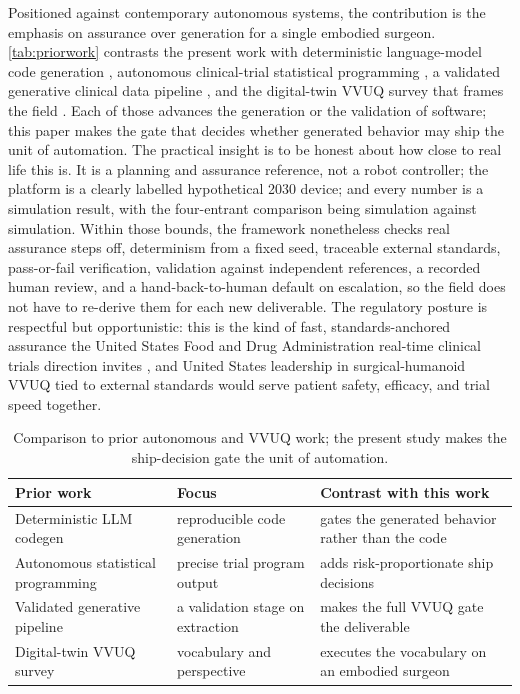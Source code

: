 Positioned against contemporary autonomous systems, the contribution is the
emphasis on assurance over generation for a single embodied surgeon.
\autoref{tab:priorwork} contrasts the present work with deterministic
language-model code generation \cite{trooskens2026compiled}, autonomous
clinical-trial statistical programming \cite{yan2026clinagent}, a validated
generative clinical data pipeline \cite{carlisle2026pipeline}, and the
digital-twin VVUQ survey that frames the field \cite{sel2025vvuq}. Each of those
advances the generation or the validation of software; this paper makes the gate
that decides whether generated behavior may ship the unit of automation. The
practical insight is to be honest about how close to real life this is. It is a
planning and assurance reference, not a robot controller; the platform is a
clearly labelled hypothetical 2030 device; and every number is a simulation
result, with the four-entrant comparison being simulation against simulation.
Within those bounds, the framework nonetheless checks real assurance steps off,
determinism from a fixed seed, traceable external standards, pass-or-fail
verification, validation against independent references, a recorded human review,
and a hand-back-to-human default on escalation, so the field does not have to
re-derive them for each new deliverable. The regulatory posture is respectful but
opportunistic: this is the kind of fast, standards-anchored assurance the United
States Food and Drug Administration real-time clinical trials direction invites
\cite{fda2026realtime}, and United States leadership in surgical-humanoid VVUQ
tied to external standards would serve patient safety, efficacy, and trial speed
together.

\begin{table}[H]
\caption{Comparison to prior autonomous and VVUQ work; the present study makes
the ship-decision gate the unit of automation.}
\label{tab:priorwork}
\centering
\footnotesize
\begin{tabularx}{\textwidth}{L{3.4cm} Y Y}
\toprule
\textbf{Prior work} & \textbf{Focus} & \textbf{Contrast with this work} \\
\midrule
Deterministic LLM codegen & reproducible code generation & gates the generated behavior rather than the code \\
Autonomous statistical programming & precise trial program output & adds risk-proportionate ship decisions \\
Validated generative pipeline & a validation stage on extraction & makes the full VVUQ gate the deliverable \\
Digital-twin VVUQ survey & vocabulary and perspective & executes the vocabulary on an embodied surgeon \\
\bottomrule
\end{tabularx}
\end{table}

